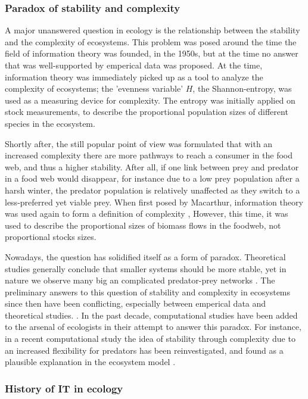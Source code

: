 \documentclass[../main.tex]{subfiles}
\begin{document}
\subsubsection{Paradox of stability and complexity}

A major unanswered question in ecology is the relationship between the stability and the complexity of ecosystems.
This problem was posed around the time the field of information theory was founded, in the 1950s, but at the time no answer that was well-supported by emperical data was proposed.
At the time, information theory was immediately picked up as a tool to analyze the complexity of ecosystems; the 'evenness variable' $H$, the Shannon-entropy, was used as a measuring device for complexity.
The entropy was initially applied on stock measurements, to describe the proportional population sizes of different species in the ecosystem.

Shortly after, the still popular point of view was formulated that with an increased complexity there are more pathways to reach a consumer in the food web, and thus a higher stability.
After all, if one link between prey and predator in a food web would disappear, for instance due to a low prey population after a harsh winter, the predator population is relatively unaffected as they switch to a less-preferred yet viable prey.
When first posed by Macarthur, information theory was used again to form a definition of complexity \cite{macarthur1955fluctuations},
However, this time, it was used to describe the proportional sizes of biomass flows in the foodweb, not proportional stocks sizes.

Nowadays, the question has solidified itself as a form of paradox.
Theoretical studies generally conclude that smaller systems should be more stable, yet in nature we observe many big an complicated predator-prey networks \cite{kondoh2003foraging}.
The preliminary answers to this question of stability and complexity in ecosystems since then have been conflicting, especially between emperical data and theoretical studies. \cite{pimm1984complexity}.
In the past decade, computational studies have been added to the arsenal of ecologists in their attempt to answer this paradox.
For instance, in a recent computational study the idea of stability through complexity due to an increased flexibility for predators has been reinvestigated, and found as a plausible explanation in the ecosystem model \cite{kondoh2003foraging}.

\subsubsection{History of IT in ecology}
\end{document}
